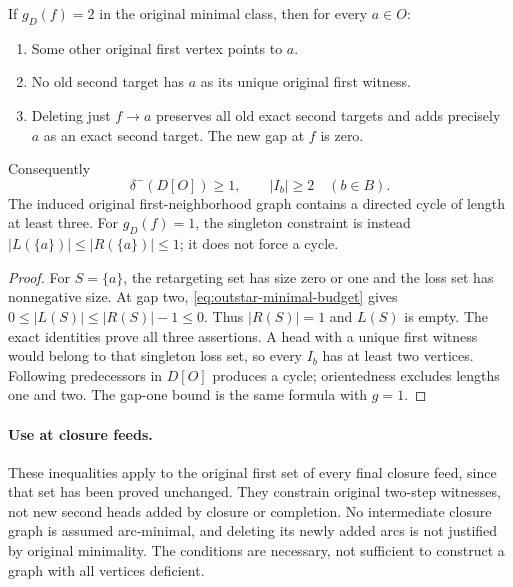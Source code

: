 \begin{corollary}
\label{cor:outstar-gap-two-multiple-witnesses}
If $g_D(f)=2$ in the original minimal class, then for every $a\in O$:
\begin{enumerate}
\item Some other original first vertex points to $a$.
\item No old second target has $a$ as its unique original first witness.
\item Deleting just $f\to a$ preserves all old exact second targets and
adds precisely $a$ as an exact second target. The new gap at $f$ is zero.
\end{enumerate}
Consequently
\[
 \delta^-(D[O])\ge1,\qquad
 |I_b|\ge2\quad(b\in B).
\]
The induced original first-neighborhood graph contains a directed cycle
of length at least three. For $g_D(f)=1$, the singleton constraint is
instead $|L(\{a\})|\le|R(\{a\})|\le1$; it does not force a cycle.
\end{corollary}
\begin{proof}
For $S=\{a\}$, the retargeting set has size zero or one and the loss
set has nonnegative size. At gap two, \eqref{eq:outstar-minimal-budget}
gives $0\le|L(S)|\le|R(S)|-1\le0$. Thus $|R(S)|=1$ and $L(S)$
is empty. The exact identities prove all three assertions. A head with
a unique first witness would belong to that singleton loss set, so every
$I_b$ has at least two vertices. Following predecessors in $D[O]$ produces
a cycle; orientedness excludes lengths one and two. The gap-one bound
is the same formula with $g=1$.
\end{proof}

\paragraph{Use at closure feeds.}
These inequalities apply to the original first set of every final
closure feed, since that set has been proved unchanged. They constrain
original two-step witnesses, not new second heads added by closure or
completion. No intermediate closure graph is assumed arc-minimal, and
deleting its newly added arcs is not justified by original minimality.
The conditions are necessary, not sufficient to construct a graph with
all vertices deficient.
